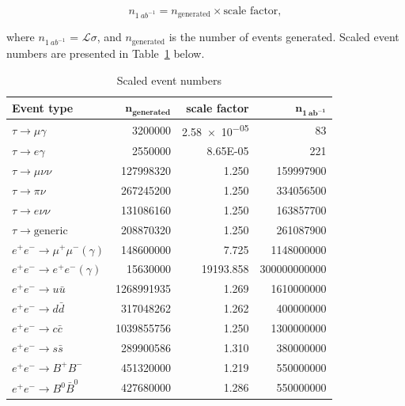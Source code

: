 \documentclass[12pt]{thesis}  %
\begin{document}
\begin{equation}
n_{\SI{1}{ab^{-1}}} = n_{\text{generated}} \times \text{scale factor},
\end{equation}

where $n_{\SI{1}{ab^{-1}}}$ = $\mathcal{L} \sigma$, and $n_{\text{generated}}$ is the number of events generated. Scaled event numbers are presented in Table~\ref{tab:scaled event numbers} below.

\begin{table}[h]
\centering
\begin{tabular}{lrrr}
\textbf{Event type} & $\mathbf{n_{\text{generated}}}$ & \textbf{scale factor} & $\mathbf{n_{\SI{1}{ab^{-1}}}}$ \\ \hline
\rowcolor[HTML]{EFEFEF} 
$\tau \to \mu\gamma$ & \num{3200000} & \num{2.58e-05} & \num{83} \\
\rowcolor[HTML]{EFEFEF}
$\tau \to e\gamma$ & \num{2550000} & \num{8.65E-05} & \num{221} \\       
$\tau \to \mu\nu\nu$ & \num{127998320} & \num{1.250} & \num{159997900} \\
$\tau \to \pi\nu$ & \num{267245200} & \num{1.250} & \num{334056500}  \\
$\tau \to e\nu\nu$ & \num{131086160} & \num{1.250} & \num{163857700}  \\
$\tau \to \text{generic}$ & \num{208870320} & \num{1.250} & \num{261087900} \\
$e^+e^- \to \mu^+\mu^-(\gamma)$ & \num{148600000} & \num{7.725} & \num{1148000000}  \\
$e^+e^- \to e^+e^-(\gamma)$ & \num{15630000} & \num{19193.858} & \num{300000000000}  \\
$e^+e^- \to u\bar{u}$ & \num{1268991935} & \num{1.269} & \num{1610000000} \\
$e^+e^- \to d\bar{d}$ & \num{317048262} & \num{1.262} & \num{400000000} \\
$e^+e^- \to c\bar{c}$ & \num{1039855756} & \num{1.250}  & \num{1300000000} \\
$e^+e^- \to s\bar{s}$ & \num{289900586} & \num{1.310}  & \num{380000000}  \\
$e^+e^- \to B^+B^-$ & \num{451320000} & \num{1.219}  & \num{550000000}  \\
$e^+e^- \to B^0\bar{B}^0$ & \num{427680000} & \num{1.286}  & \num{550000000} 
\end{tabular}
\caption{Scaled event numbers}
\label{tab:scaled event numbers}
\end{table}
\end{document}
